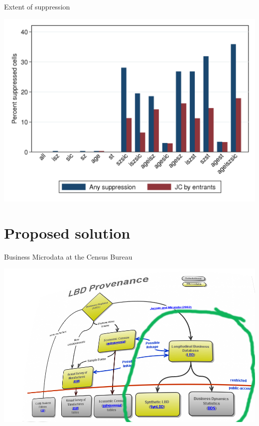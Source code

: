 \begin{frame}{Extent of suppression}
\begin{center}
\includegraphics[height=0.8\textheight]{./suppressions_estabs}
\end{center}
\end{frame}

\section[Solution]{Proposed solution}

\begin{frame}{Business Microdata at the Census Bureau}
\begin{center}
\includegraphics[height=0.8\textheight]{./LBD_Provenance_v2_tilted_hilite}
\end{center}
\end{frame}


